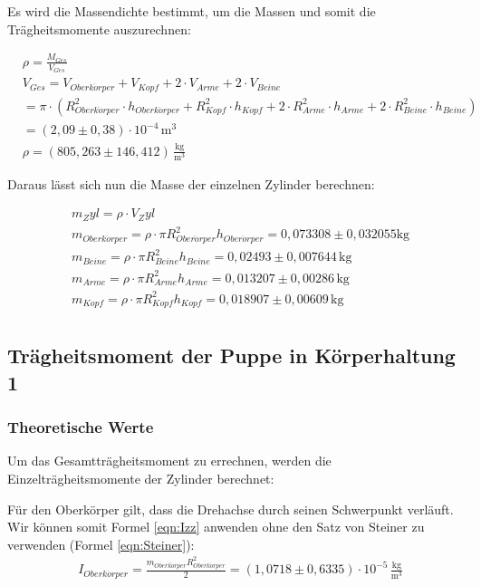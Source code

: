 Es wird die Massendichte bestimmt, um die Massen und somit die Trägheitsmomente auszurechnen:

\begin{align*}
& \rho = \frac{M_{Ges}}{V_{Ges}} \\
&  V_{Ges} = V_{Oberk\ddot{o}rper} + V_{Kopf} + 2 \cdot V_{Arme} + 2 \cdot V_{Beine} \\
&  = \pi \cdot \left(R_{Oberk\ddot{o}rper}^2  \cdot h_{Oberk\ddot{o}rper} + R_{Kopf}^2 \cdot h_{Kopf} + 2 \cdot R_{Arme}^2 \cdot h_{Arme} +2 \cdot R_{Beine}^2 \cdot h_{Beine} \right) \\
&  = (2{,}09 \pm 0{,}38) \cdot 10^{-4} \, \mathrm{m^3} \\
& \rho = (805{,}263 \pm 146{,}412) \, \mathrm{\frac{kg}{m^3}}
\end{align*}

Daraus lässt sich nun die Masse der einzelnen Zylinder berechnen:

\begin{align*}
  &  m_Zyl = \rho \cdot V_Zyl \\
  &  m_{Oberk\ddot{o}rper} = \rho \cdot \pi R_{Ober\ddot{o}rper}^2 h_{Ober\ddot{o}rper} = 0{,}073308 \pm 0{,}032055 \mathrm{kg} \\
  &  m_{Beine} = \rho \cdot \pi R_{Beine}^2 h_{Beine} = 0{,}02493 \pm 0{,}007644 \, \mathrm{kg} \\
  &  m_{Arme} = \rho \cdot \pi R_{Arme}^2 h_{Arme} = 0{,}013207 \pm 0{,}00286 \, \mathrm{kg} \\
  &  m_{Kopf} = \rho \cdot \pi R_{Kopf}^2 h_{Kopf} = 0{,}018907 \pm 0{,}00609 \, \mathrm{kg} \\
\end{align*}

\subsection{Trägheitsmoment der Puppe in Körperhaltung 1}
\label{sec:TraegheitsmomentderPuppeinKoerperhaltung 1}
\subsubsection{Theoretische Werte}

Um das Gesamtträgheitsmoment zu errechnen, werden die Einzelträgheitsmomente der Zylinder berechnet:

Für den Oberkörper gilt, dass die Drehachse durch seinen Schwerpunkt verläuft. Wir können somit Formel \ref{eqn:Izz} anwenden ohne den 
Satz von Steiner zu verwenden (Formel \ref{eqn:Steiner}):
\begin{align*}
  & I_{Oberk\ddot{o}rper} = \frac{m_{Oberk\ddot{o}rper}R_{Oberk\ddot{o}rper}^2}{2} = (1{,}0718 \pm 0{,}6335) \cdot 10^{-5} \, \mathrm{\frac{kg}{m^3}}
\end{align*}

